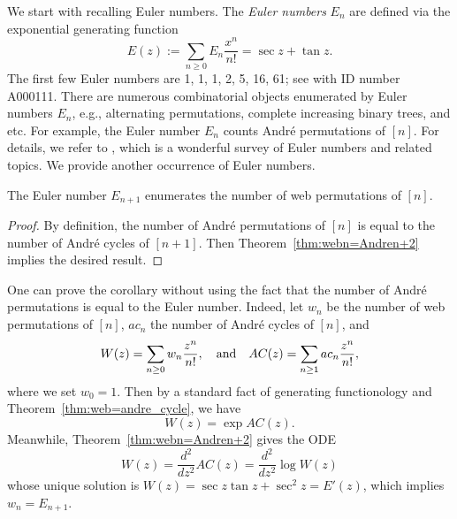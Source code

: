 We start with recalling Euler numbers.
The \emph{Euler numbers} \( E_n \) are defined via the exponential
generating function
\[
  E(z) := \sum_{n\ge 0} E_n \frac{x^n}{n!} = \sec z + \tan z.
\]
The first few Euler numbers are 1, 1, 1, 2, 5, 16, 61;
see \cite{OEIS} with ID number A000111.
There are numerous combinatorial objects enumerated by Euler numbers \( E_n \),
e.g., alternating permutations, complete increasing binary trees, and etc.
For example, the Euler number \( E_n \) counts Andr\'e permutations of \( [n] \).
For details, we refer to \cite{Sta10}, which is a wonderful survey of Euler numbers and related topics.
We provide another occurrence of Euler numbers.

\begin{cor} \label{cor:Euler}
  The Euler number \( E_{n+1} \) enumerates
  the number of web permutations of \( [n] \).
\end{cor}
\begin{proof}
  By definition, the number of Andr\'e permutations of \( [n] \) is equal to
  the number of Andr\'e cycles of \( [n+1] \).
  Then Theorem~\ref{thm:webn=Andren+2} implies the desired result.
\end{proof}
\begin{rmk}
  One can prove the corollary without using the fact that the number of Andr\'e
  permutations is equal to the Euler number.
  Indeed, let \( w_n \) be the number of web permutations of \( [n] \),
  \( ac_n \) the number of Andr\'e cycles of \( [n] \), and
  \[
    W(z) = \sum_{n\ge 0} w_n \frac{z^n}{n!}, \quad\mbox{and}\quad
    AC(z) = \sum_{n\ge 1} ac_n \frac{z^n}{n!},
  \]
  where we set \( w_0 = 1 \).
  Then by a standard fact of generating functionology \cite[Corollary~5.1.6]{Sta99} and Theorem~\ref{thm:web=andre_cycle},
  we have
  \[
    W(z) = \exp AC(z).
  \]
  Meanwhile, Theorem~\ref{thm:webn=Andren+2} gives the ODE
  \[
    W(z) = \frac{d^2}{dz^2} AC(z) = \frac{d^2}{dz^2} \log W(z)
  \]
  whose unique solution is \( W(z) = \sec z \tan z + \sec^2 z =  E'(z) \), which implies \( w_n = E_{n+1} \).
\end{rmk}

